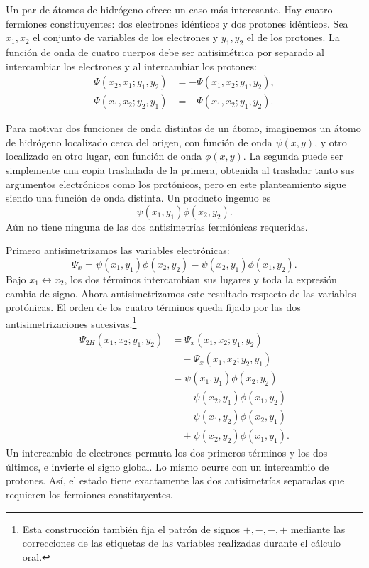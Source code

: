 Un par de átomos de hidrógeno ofrece un caso más interesante. Hay cuatro fermiones constituyentes: dos electrones idénticos y dos protones idénticos. Sea \(x_1,x_2\) el conjunto de variables de los electrones y \(y_1,y_2\) el de los protones. La función de onda de cuatro cuerpos debe ser antisimétrica por separado al intercambiar los electrones y al intercambiar los protones:
\begin{align}
\Psi(x_2,x_1;y_1,y_2)
&=-\Psi(x_1,x_2;y_1,y_2),\\
\Psi(x_1,x_2;y_2,y_1)
&=-\Psi(x_1,x_2;y_1,y_2).
\end{align}

Para motivar dos funciones de onda distintas de un átomo, imaginemos un átomo de hidrógeno localizado cerca del origen, con función de onda \(\psi(x,y)\), y otro localizado en otro lugar, con función de onda \(\phi(x,y)\). La segunda puede ser simplemente una copia trasladada de la primera, obtenida al trasladar tanto sus argumentos electrónicos como los protónicos, pero en este planteamiento sigue siendo una función de onda distinta. Un producto ingenuo es
\begin{equation}
\psi(x_1,y_1)\phi(x_2,y_2).
\end{equation}
Aún no tiene ninguna de las dos antisimetrías fermiónicas requeridas.

Primero antisimetrizamos las variables electrónicas:
\begin{equation}
\Psi_x=
\psi(x_1,y_1)\phi(x_2,y_2)
-\psi(x_2,y_1)\phi(x_1,y_2).
\end{equation}
Bajo \(x_1\leftrightarrow x_2\), los dos términos intercambian sus lugares y toda la expresión cambia de signo. Ahora antisimetrizamos este resultado respecto de las variables protónicas. El orden de los cuatro términos queda fijado por las dos antisimetrizaciones sucesivas.\footnote{Esta construcción también fija el patrón de signos \(+,-,-,+\) mediante las correcciones de las etiquetas de las variables realizadas durante el cálculo oral.}
\begin{align}
\Psi_{2H}(x_1,x_2;y_1,y_2)
&=\Psi_x(x_1,x_2;y_1,y_2)\nonumber\\
&\quad{}-\Psi_x(x_1,x_2;y_2,y_1)\\
&=\psi(x_1,y_1)\phi(x_2,y_2)\nonumber\\
&\quad{}-\psi(x_2,y_1)\phi(x_1,y_2)\nonumber\\
&\quad{}-\psi(x_1,y_2)\phi(x_2,y_1)\nonumber\\
&\quad{}+\psi(x_2,y_2)\phi(x_1,y_1).
\label{eq:two-hydrogen-antisymmetrized}
\end{align}
Un intercambio de electrones permuta los dos primeros términos y los dos últimos, e invierte el signo global. Lo mismo ocurre con un intercambio de protones. Así, el estado tiene exactamente las dos antisimetrías separadas que requieren los fermiones constituyentes.

